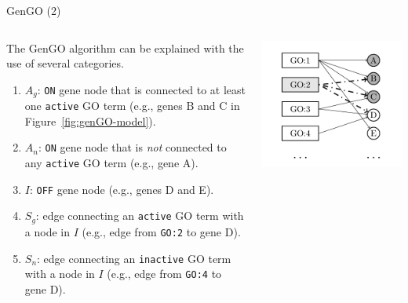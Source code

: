 \documentclass{beamer}
\begin{document}
\begin{frame}{GenGO (2)}
\begin{columns}
\begin{scriptsize}

The GenGO algorithm can be explained with the use of several
categories.

\begin{enumerate}
\item $A_g$: \texttt{ON} gene node that is connected to at least one
  \texttt{active} GO term (e.g., genes B and C in
  Figure~\ref{fig:genGO-model}).
\item $A_n$: \texttt{ON} gene node that is \textit{not} connected to any
  \texttt{active} GO term (e.g., gene A).
\item $I$: \texttt{OFF} gene node (e.g., genes D and E).
\item $S_g$: edge connecting  an \texttt{active} GO term with a node
  in $I$ (e.g., edge from \texttt{GO:2} to gene D).
\item $S_n$: edge connecting  an \texttt{inactive} GO term with a node
  in $I$ (e.g., edge from \texttt{GO:4} to gene D).
\end{enumerate}
\end{scriptsize}
 \includegraphics[width=1\textwidth]{./img/genGO.png}
\end{columns}

\end{frame}
\end{document}
